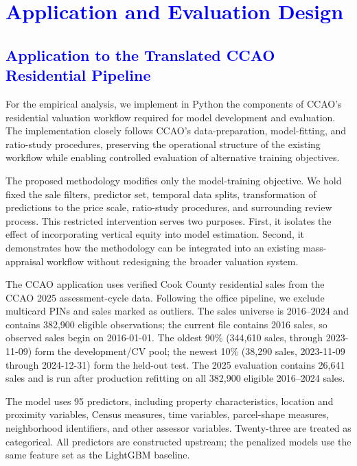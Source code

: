 \documentclass[10pt]{article}
\theoremstyle{definition}
\newcommand{\1}{\mathbf{1}}
\newcommand{\advisorchange}[1]{{\color{blue}#1}}
\newcommand{\blueheading}[1]{\texorpdfstring{\textcolor{blue}{#1}}{#1}}
\begin{document}
{{\section{\blueheading{Application and Evaluation Design}}
\label{sec:empirical_design}

\subsection{\blueheading{Application to the Translated CCAO Residential Pipeline}}
\label{subsec:ccao_design}
{\color{red} For the empirical analysis, we implement in Python the components of CCAO's residential valuation workflow required for model development and evaluation. The implementation closely follows CCAO's data-preparation, model-fitting, and ratio-study procedures, preserving the operational structure of the existing workflow while enabling controlled evaluation of alternative training objectives.

The proposed methodology modifies only the model-training objective. We hold fixed the sale filters, predictor set, temporal data splits, transformation of predictions to the price scale, ratio-study procedures, and surrounding review process. This restricted intervention serves two purposes. First, it isolates the effect of incorporating vertical equity into model estimation. Second, it demonstrates how the methodology can be integrated into an existing mass-appraisal workflow without redesigning the broader valuation system.}
\advisorchange{The CCAO application uses verified Cook County residential sales} from the CCAO 2025 assessment-cycle data. Following the office pipeline, we exclude multicard PINs and sales marked as outliers. The sales universe is 2016--2024 and contains 382,900 eligible observations; the current file contains 2016 sales, so observed sales begin on 2016-01-01. The oldest 90\% (344,610 sales, through 2023-11-09) form the development/CV pool; the newest 10\% (38,290 sales, 2023-11-09 through 2024-12-31) form the held-out test. The 2025 evaluation contains 26,641 sales and is run after production refitting on all 382,900 eligible 2016--2024 sales.

The model uses 95 predictors, including property characteristics, location and proximity variables, Census measures, time variables, parcel-shape measures, neighborhood identifiers, and other assessor variables. Twenty-three are treated as categorical. All predictors are constructed upstream; the penalized models use the same feature set as the LightGBM baseline.

}}
\end{document}
